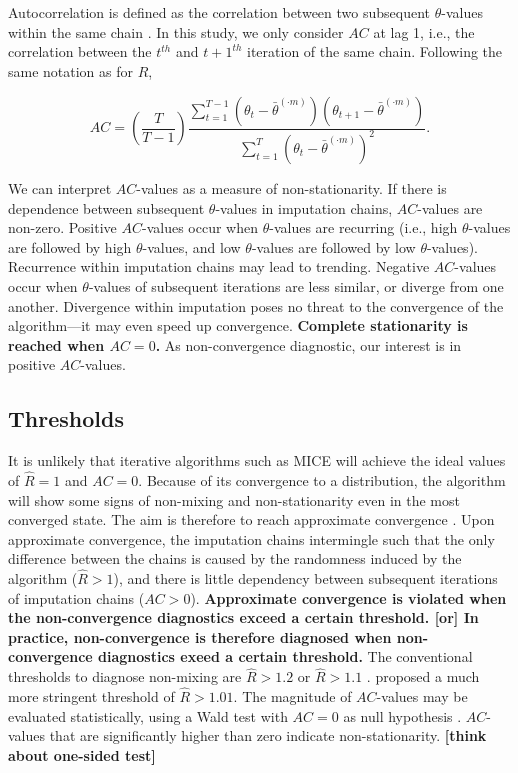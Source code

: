 \documentclass[Royal,times,sageh]{sagej}
\begin{document}
Autocorrelation is defined as the correlation between two subsequent \(\theta\)-values within the same chain \citep[p.~147]{lync07}. In this study, we only consider \(AC\) at lag 1, i.e., the correlation between the \(t^{th}\) and \(t+1^{th}\) iteration of the same chain. Following the same notation as for \(\widehat{R}\),

\begin{equation*}
AC = \left( \frac{T}{T-1} \right) \frac{\sum_{t=1}^{T-1}(\theta_t - \bar{\theta}^{(\cdot m)})(\theta_{t+1} - \bar{\theta}^{(\cdot m)})}{\sum_{t=1}^{T}(\theta_t - \bar{\theta}^{(\cdot m)})^2}.
\end{equation*}

We can interpret \(AC\)-values as a measure of non-stationarity. If there is dependence between subsequent \(\theta\)-values in imputation chains, \(AC\)-values are non-zero. Positive \(AC\)-values occur when \(\theta\)-values are recurring (i.e., high \(\theta\)-values are followed by high \(\theta\)-values, and low \(\theta\)-values are followed by low \(\theta\)-values). Recurrence within imputation chains may lead to trending. Negative \(AC\)-values occur when \(\theta\)-values of subsequent iterations are less similar, or diverge from one another. Divergence within imputation poses no threat to the convergence of the algorithm---it may even speed up convergence. \textbf{Complete stationarity is reached when \(AC=0\).} As non-convergence diagnostic, our interest is in positive \(AC\)-values.

\hypertarget{thresholds}{%
\subsection{Thresholds}\label{thresholds}}

It is unlikely that iterative algorithms such as MICE will achieve the ideal values of \(\widehat{R}=1\) and \(AC=0\). Because of its convergence to a distribution, the algorithm will show some signs of non-mixing and non-stationarity even in the most converged state. The aim is therefore to reach approximate convergence \citep{gelm13}. Upon approximate convergence, the imputation chains intermingle such that the only difference between the chains is caused by the randomness induced by the algorithm (\(\widehat{R} > 1\)), and there is little dependency between subsequent iterations of imputation chains (\(AC > 0\)). \textbf{Approximate convergence is violated when the non-convergence diagnostics exceed a certain threshold. {[}or{]} In practice, non-convergence is therefore diagnosed when non-convergence diagnostics exeed a certain threshold.} The conventional thresholds to diagnose non-mixing are \(\widehat{R} > 1.2\) \citep{gelm92} or \(\widehat{R} > 1.1\) \citep{gelm13}. \citet{veht19} proposed a much more stringent threshold of \(\widehat{R} > 1.01\). The magnitude of \(AC\)-values may be evaluated statistically, using a Wald test with \(AC=0\) as null hypothesis \citep{box15}. \(AC\)-values that are significantly higher than zero indicate non-stationarity. \textbf{{[}think about one-sided test{]}}
\end{document}
